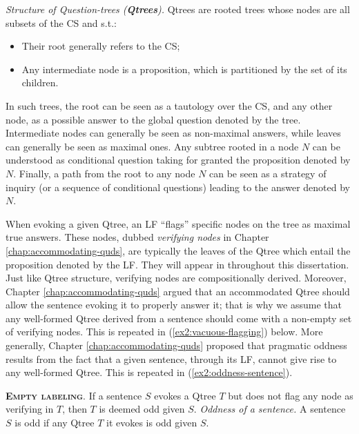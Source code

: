 \begin{exe}
	 {\textit{Structure of Question-trees (\textbf{Qtrees}).} Qtrees are rooted trees whose nodes are all subsets of the CS and s.t.:
		\begin{itemize}
			\item Their root generally refers to the CS;
			\item Any intermediate node is a proposition, which is partitioned by the set of its children.
		\end{itemize}
	}
\end{exe}

In such trees, the root can be seen as a tautology over the CS, and any other node, as a possible answer to the global question denoted by the tree. Intermediate nodes can generally be seen as non-maximal answers, while leaves can generally be seen as maximal ones. Any subtree rooted in a node $N$ can be understood as conditional question taking for granted the proposition denoted by $N$. Finally, a path from the root to any node $N$ can be seen as a strategy of inquiry (or a sequence of conditional questions) leading to the answer denoted by $N$.



When evoking a given Qtree, an LF ``flags'' specific nodes on the tree as maximal true answers. These nodes, dubbed \textit{verifying nodes} in Chapter \ref{chap:accommodating-quds}, are typically the leaves of the Qtree which entail the proposition denoted by the LF. They will appear in \setlength{\fboxsep}{1pt} throughout this dissertation. Just like Qtree structure, verifying nodes are compositionally derived. Moreover, Chapter \ref{chap:accommodating-quds} argued that an accommodated Qtree should allow the sentence evoking it to properly answer it; that is why we assume that any well-formed Qtree derived from a sentence should come with a non-empty set of verifying nodes. This is repeated in (\ref{ex2:vacuous-flagging}) below. More generally, Chapter \ref{chap:accommodating-quds} proposed that pragmatic oddness results from the fact that a given sentence, through its LF, cannot give rise to any well-formed Qtree. This is repeated in (\ref{ex2:oddness-sentence}).


\begin{exe}
	 {\textsc{\textbf{Empty labeling}}. If a sentence $S$ evokes a Qtree $T$ but does not flag any node as verifying in $T$, then $T$ is deemed odd given $S$.}
	 {\textit{Oddness of a sentence.} A sentence $S$ is odd if any Qtree $T$ it evokes is odd given $S$.}
\end{exe}

